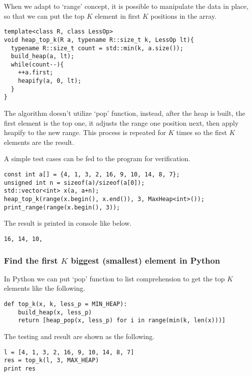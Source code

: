 \documentclass{article}
\begin{document}
When we adapt to `range' concept, it is possible to manipulate
the data in place, so that we can put the top $K$ element
in first $K$ positions in the array.

\begin{lstlisting}
template<class R, class LessOp>
void heap_top_k(R a, typename R::size_t k, LessOp lt){
  typename R::size_t count = std::min(k, a.size());
  build_heap(a, lt);
  while(count--){
    ++a.first;
    heapify(a, 0, lt);
  }
}
\end{lstlisting}

The algorithm doesn't utilize `pop' function, instead, after
the heap is built, the first element is the top one, it
adjusts the range one position next, then apply heapify
to the new range. This process is repeated for $K$ times
so the first $K$ elements are the result.

A simple test cases can be fed to the program for verification.

\begin{lstlisting}
const int a[] = {4, 1, 3, 2, 16, 9, 10, 14, 8, 7};
unsigned int n = sizeof(a)/sizeof(a[0]);
std::vector<int> x(a, a+n);
heap_top_k(range(x.begin(), x.end()), 3, MaxHeap<int>());
print_range(range(x.begin(), 3));
\end{lstlisting}

The result is printed in console like below.

\begin{verbatim}
16, 14, 10,
\end{verbatim}

\subsubsection*{Find the first $K$ biggest (smallest) element in Python}

In Python we can put `pop' function to list comprehension to
get the top $K$ elements like the following.

\lstset{language=Python}
\begin{lstlisting}
def top_k(x, k, less_p = MIN_HEAP):
    build_heap(x, less_p)
    return [heap_pop(x, less_p) for i in range(min(k, len(x)))]
\end{lstlisting}

The testing and result are shown as the following.

\begin{lstlisting}
l = [4, 1, 3, 2, 16, 9, 10, 14, 8, 7]
res = top_k(l, 3, MAX_HEAP)
print res
\end{lstlisting}
\end{document}
